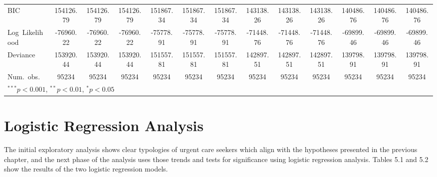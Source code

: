 \documentclass[12pt,twoside]{reedthesis}
\begin{document}
\begin{table}
\begin{center}
\begin{tiny}
\begin{tabular}{l@{} c@{} c@{} c@{} c@{} c@{} c@{} c@{} c@{} c@{} c@{} c@{} c@{} }
  BIC                                & 154126.79              & 154126.79              & 154126.79              & 151867.34              & 151867.34              & 151867.34              & 143138.26              & 143138.26              & 143138.26              & 140486.76              & 140486.76              & 140486.76              \\
  Log\ Likelihood                    & -76960.22              & -76960.22              & -76960.22              & -75778.91              & -75778.91              & -75778.91              & -71448.76              & -71448.76              & -71448.76              & -69899.46              & -69899.46              & -69899.46              \\
  Deviance                           & 153920.44              & 153920.44              & 153920.44              & 151557.81              & 151557.81              & 151557.81              & 142897.51              & 142897.51              & 142897.51              & 139798.91              & 139798.91              & 139798.91              \\
  Num.\ obs.                         & 95234                  & 95234                  & 95234                  & 95234                  & 95234                  & 95234                  & 95234                  & 95234                  & 95234                  & 95234                  & 95234                  & 95234                  \\
  \bottomrule
  \multicolumn{13}{l}{\tiny{$^{***}p<0.001$, $^{**}p<0.01$, $^*p<0.05$}}
  \end{tabular}
  \end{tiny}
  \label{table:coefficients}
  \end{center}
  \end{table}
  
  \doublespacing
  
  \section*{Logistic Regression
  Analysis}\label{logistic-regression-analysis}
  
  The initial exploratory analysis shows clear typologies of urgent care
  seekers which align with the hypotheses presented in the previous
  chapter, and the next phase of the analysis uses those trends and tests
  for significance using logistic regression analysis. Tables 5.1 and 5.2
  show the results of the two logistic regression models.
  
\end{document}
